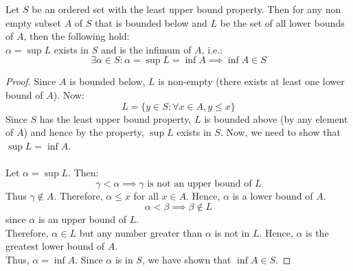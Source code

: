 \documentclass[openany]{book}
\begin{document}
\begin{mytheorem}
    Let $S$ be an ordered set with the least upper bound property. Then for any non empty subset $A$ of $S$ that is bounded below and $L$ be the set of all lower bounds of $A$, then the following hold: \\ 
    $\alpha = \sup L$ exists in $S$ and is the infimum of $A$, i.e.: 
    $$\exists \alpha \in S: \alpha = \sup L = \inf A \implies \inf A \in S$$
\end{mytheorem}
\begin{proof}
    Since $A$ is bounded below, $L$ is non-empty (there exists at least one lower bound of $A$). Now: 
    $$L = \{y\in S: \forall x \in A, y \leq x\}$$
    Since $S$ has the least upper bound property, $L$ is bounded above (by any element of $A$) and hence by the property, $\sup L$ exists in $S$. Now, we need to show that $\sup L = \inf A$. \\ \\ 
    Let $\alpha = \sup L$. Then: 
    $$\gamma < \alpha \implies \gamma \text{ is not an upper bound of } L$$
    Thus $\gamma \notin A$. Therefore, $\alpha \leq x$ for all $x \in A$. Hence, $\alpha$ is a lower bound of $A$. \\
    $$\alpha < \beta \implies \beta \notin L$$ since $\alpha$ is an upper bound of $L$. \\
    Therefore, $\alpha \in L$ but any number greater than $\alpha$ is not in $L$. Hence, $\alpha$ is the greatest lower bound of $A$. \\
    Thus, $\alpha = \inf A$. Since $\alpha$ is in $S$, we have shown that $\inf A \in S$.
\end{proof}
\end{document}

